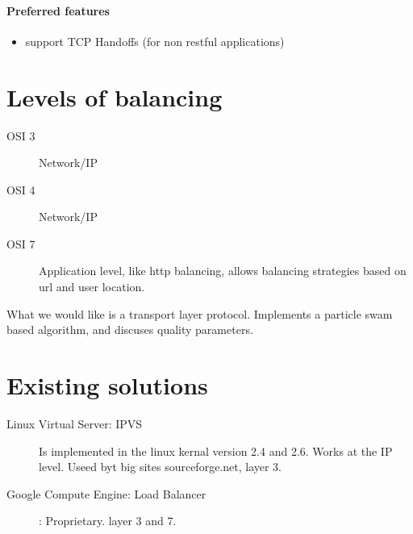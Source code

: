 \paragraph{Preferred features}
\begin{itemize}
	\item support TCP Handoffs (for non restful applications)
\end{itemize}

\section{Levels of balancing}
\begin{description}
	\item[OSI 3] Network/IP %
	\item[OSI 4] Network/IP
	\item[OSI 7] {Application level, like http balancing, allows balancing strategies based on url and user location.}
\end{description}

What we would like is a transport layer protocol.
\cite{Ludwig:SwarmIntelligenceGridLoadBalancing} Implements a particle swam based algorithm, and discuses quality parameters.

\section{Existing solutions}
\begin{description}
	\item[Linux Virtual Server: IPVS] Is implemented in the linux kernal version 2.4 and 2.6. Works at the IP level. Useed byt big sites sourceforge.net, layer 3.
	\item[Google Compute Engine: Load Balancer]: Proprietary. layer 3 and 7.
\end{description}